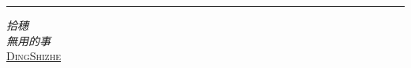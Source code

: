 
\newcommand*{\plogo}{\FiveFlowerOpen}

\newcommand{\Author}{\href{https://github.com/DingShizhe}{DingShizhe}}
\newcommand\myquotepage[3]{\thispagestyle{empty}\vspace*{\fill}\vspace*{\fill}\textcolor{#1}{\textit{#2\\\rightline{#3}}}\vspace*{\fill}\vspace*{\fill}\vspace*{\fill}}

\begin{titlepage}
	\raggedleft
	\rule{1pt}{\textheight} %
	\hspace{0.06\textwidth}
	\parbox[b]{0.80\textwidth}{
		{
            {\fontsize{40}{50}\selectfont
            \it 拾穗}
        }\\[2\baselineskip] %
		\textcolor{by}{\large\textit{無用的事}}\\[4\baselineskip]{\large\textsc{\Author}}
        
		\vspace{0.5\textheight}
		\color{Sienna}{\noindent 且慢~\plogo}\\[\baselineskip]
	}
    
\end{titlepage}